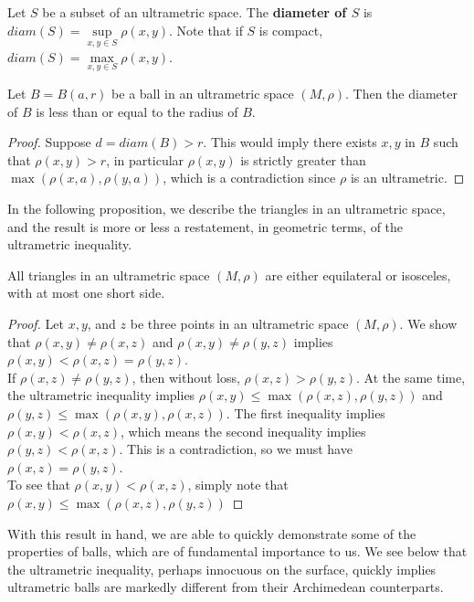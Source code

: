 \begin{definition}
Let $S$ be a subset of an ultrametric space. The \textbf{diameter of $S$} is $diam(S) = \sup\limits_{x,y\in S}\rho(x,y)$. Note that if $S$ is compact, $diam(S) = \max\limits_{x,y\in S}\rho(x,y)$.
\end{definition}

\begin{proposition}
	Let $B=B(a, r)$ be a ball in an ultrametric space $(M,\rho)$. Then the diameter of $B$ is less than or equal to the radius of $B$.    
\end{proposition}

\begin{proof}
Suppose $d = diam(B) > r$. This would imply there exists $x,y$ in $B$ such that $\rho(x,y) > r$, in particular $\rho(x,y)$ is strictly greater than $\max(\rho(x,a), \rho(y,a))$, which is a contradiction since $\rho$ is an ultrametric.
\end{proof}

In the following proposition, we describe the triangles in an ultrametric space, and the result is more or less a restatement, in geometric terms, of the ultrametric inequality.\\

\begin{proposition}
	 All triangles in an ultrametric space $(M,\rho)$ are either equilateral or isosceles, with at most one short side. 
\end{proposition}

\begin{proof}
Let $x,y$, and $z$ be three points in an ultrametric space $(M,\rho)$. We show that $\rho(x,y) \neq \rho(x,z)$ and $\rho(x,y) \neq \rho(y,z)$ implies $\rho(x,y) < \rho(x,z) = \rho(y,z)$.\\

If $\rho(x,z) \neq \rho(y,z)$, then without loss, $\rho(x,z) > \rho(y,z)$. At the same time, the ultrametric inequality implies $\rho(x,y) \leq \max(\rho(x,z), \rho(y,z))$ and  $\rho(y,z) \leq \max(\rho(x,y), \rho(x,z))$. The first inequality implies $\rho(x,y) < \rho(x,z)$, which means the second inequality implies $\rho(y,z) < \rho(x,z)$. This is a contradiction, so we must have $\rho(x,z) = \rho(y,z)$.\\

To see that $\rho(x,y) < \rho(x,z)$, simply note that $\rho(x,y) \leq \max(\rho(x,z), \rho(y,z))$
\end{proof}

With this result in hand, we are able to quickly demonstrate some of the properties of balls, which are of fundamental importance to us. We see below that the ultrametric inequality, perhaps innocuous on the surface, quickly implies ultrametric balls are markedly different from their Archimedean counterparts.\\

